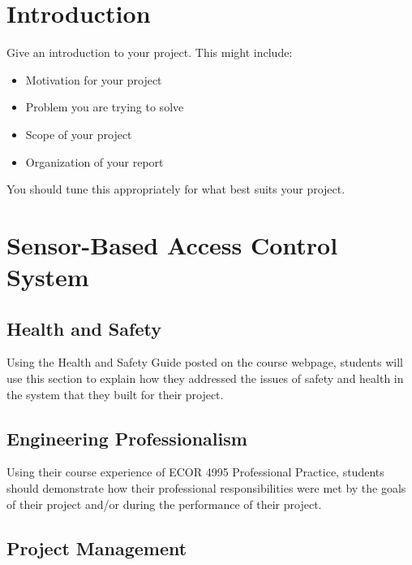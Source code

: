 \documentclass[12pt]{report}
\begin{document}
\chapter{Introduction}

Give an introduction to your project.  This might include:
\begin{itemize}
  \item Motivation for your project
  \item Problem you are trying to solve
  \item Scope of your project
  \item Organization of your report
\end{itemize}
You should tune this appropriately for what best suits your project.



\chapter{Sensor-Based Access Control System}


\section{Health and Safety}

Using the Health and Safety Guide posted on the course webpage, students will use this section to explain how they addressed the issues of safety and health in the system that they built for their project.


\section{Engineering Professionalism}

Using their course experience of ECOR 4995 Professional Practice, students should demonstrate how their professional responsibilities were met by the goals of their project and/or during the performance of their project. 


\section{Project Management}
\end{document}
